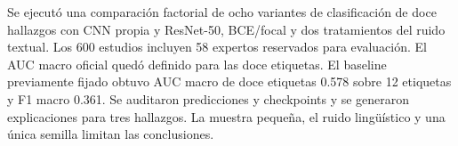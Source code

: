 Se ejecutó una comparación factorial de ocho variantes de clasificación de doce hallazgos con CNN propia y ResNet-50, BCE/focal y dos tratamientos del ruido textual. Los 600 estudios incluyen 58 expertos reservados para evaluación. El AUC macro oficial quedó definido para las doce etiquetas. El baseline previamente fijado obtuvo AUC macro de doce etiquetas 0.578 sobre 12 etiquetas y F1 macro 0.361. Se auditaron predicciones y checkpoints y se generaron explicaciones para tres hallazgos. La muestra pequeña, el ruido lingüístico y una única semilla limitan las conclusiones.
